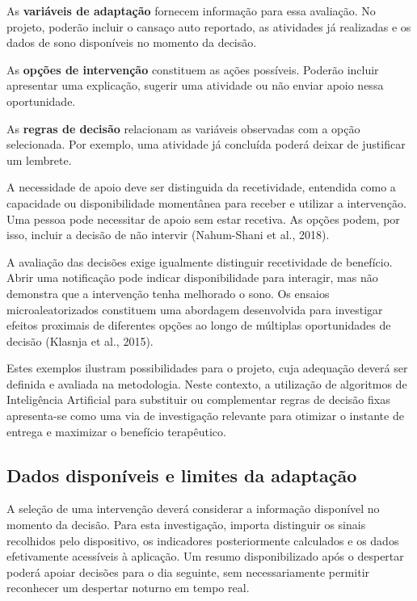 As \textbf{variáveis de adaptação} fornecem informação para essa avaliação. No projeto, poderão incluir o cansaço auto reportado, as atividades já realizadas e os dados de sono disponíveis no momento da decisão.

As \textbf{opções de intervenção} constituem as ações possíveis. Poderão incluir apresentar uma explicação, sugerir uma atividade ou não enviar apoio nessa oportunidade.

As \textbf{regras de decisão} relacionam as variáveis observadas com a opção selecionada. Por exemplo, uma atividade já concluída poderá deixar de justificar um lembrete.

A necessidade de apoio deve ser distinguida da recetividade, entendida como a capacidade ou disponibilidade momentânea para receber e utilizar a intervenção. Uma pessoa pode necessitar de apoio sem estar recetiva. As opções podem, por isso, incluir a decisão de não intervir (Nahum-Shani et al., 2018).

A avaliação das decisões exige igualmente distinguir recetividade de benefício. Abrir uma notificação pode indicar disponibilidade para interagir, mas não demonstra que a intervenção tenha melhorado o sono. Os ensaios microaleatorizados constituem uma abordagem desenvolvida para investigar efeitos proximais de diferentes opções ao longo de múltiplas oportunidades de decisão (Klasnja et al., 2015).

Estes exemplos ilustram possibilidades para o projeto, cuja adequação deverá ser definida e avaliada na metodologia. Neste contexto, a utilização de algoritmos de Inteligência Artificial para substituir ou complementar regras de decisão fixas apresenta-se como uma via de investigação relevante para otimizar o instante de entrega e maximizar o benefício terapêutico.  

\subsection{Dados disponíveis e limites da adaptação}
\label{sec:chap2_dadosDisponiveis}

A seleção de uma intervenção deverá considerar a informação disponível no momento da decisão. Para esta investigação, importa distinguir os sinais recolhidos pelo dispositivo, os indicadores posteriormente calculados e os dados efetivamente acessíveis à aplicação. Um resumo disponibilizado após o despertar poderá apoiar decisões para o dia seguinte, sem necessariamente permitir reconhecer um despertar noturno em tempo real.

